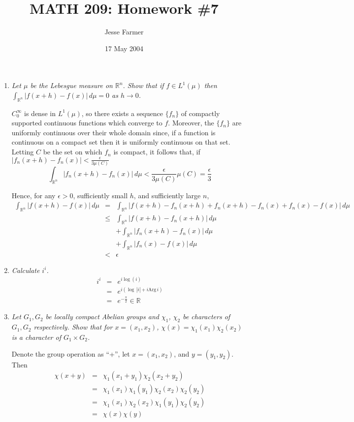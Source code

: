 \documentclass[letterpaper,11pt]{article}
\title{MATH 209: Homework \#7}
\author{Jesse Farmer}
\date{17 May 2004}
\newcommand{\R}{\mathbb{R}}
\begin{document}
\maketitle
\begin{enumerate}

\item \emph{Let $\mu$ be the Lebesgue measure on $\R^n$.  Show that if $f \in L^1(\mu)$ then $\int_{\R^n} |f(x+h) - f(x)| \,d\mu = 0$ as $h \rightarrow 0$.}

$C_0^\infty$ is dense in $L^1(\mu)$, so there exists a sequence $\{f_n\}$ of compactly supported continuous functions which converge to $f$.  Moreover, the $\{f_n\}$ are uniformly continuous over their whole domain since, if a function is continuous on a compact set then it is uniformly continuous on that set.  Letting $C$ be the set on which $f_n$ is compact, it follows that, if $|f_n(x+h) - f_n(x)| < \frac{\epsilon}{3\mu(C)}$
\[
\int_{\R^n} |f_n(x+h) - f_n(x)| \,d\mu < \frac{\epsilon}{3\mu(C)}\mu(C) = \frac{\epsilon}{3}
\]

Hence, for any $\epsilon > 0$, sufficiently small $h$, and sufficiently large $n$, 
\begin{eqnarray*}
\int_{\R^n} |f(x+h) - f(x)| \,d\mu &=& \int_{\R^n} |f(x+h) - f_n(x+h) + f_n(x+h) - f_n(x) + f_n(x) - f(x)| \,d\mu \\
&\leq& \int_{\R^n}|f(x+h) - f_n(x+h)| \,d\mu \\ && + \int_{\R^n} |f_n(x+h) - f_n(x)| \,d\mu \\ && + \int_{\R^n} |f_n(x) - f(x)| \,d\mu \\
&<& \epsilon
\end{eqnarray*}
\item \emph{Calculate $i^i$.}
\begin{eqnarray*}
i^i &=& e^{i \log(i)} \\
&=& e^{i\left(\log\,|i| + i \text{Arg}\,i\right)} \\
&=& e^{-\frac{\pi}{2}} \in \R
\end{eqnarray*}

\item \emph{Let $G_1,G_2$ be locally compact Abelian groups and $\chi_1$, $\chi_2$ be characters of $G_1,G_2$ respectively.  Show that for $x = (x_1,x_2)$, $\chi(x) = \chi_1(x_1)\chi_2(x_2)$ is a character of $G_1 \times G_2$.}

Denote the group operation as ``+'', let $x = (x_1,x_2)$, and $y = (y_1,y_2)$. Then
\begin{eqnarray*}
\chi(x + y) &=& \chi_1(x_1 + y_1)\chi_2(x_2+y_2) \\
&=& \chi_1(x_1)\chi_1(y_1)\chi_2(x_2)\chi_2(y_2) \\
&=& \chi_1(x_1)\chi_2(x_2)\chi_1(y_1)\chi_2(y_2) \\
&=& \chi(x)\chi(y)
\end{eqnarray*}


\end{enumerate}
\end{document}
